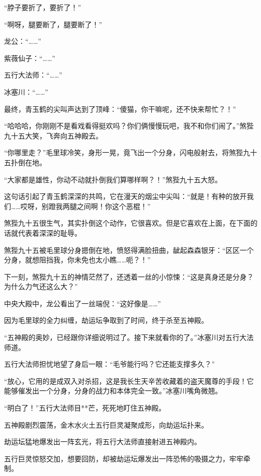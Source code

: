 \begin{this_body}
“脖子要折了，要折了！”

“啊呀，腿要断了，腿要断了！”

龙公：“……”

紫薇仙子：“……”

五行大法师：“……”

冰塞川：“……”

最终，青玉鹤的尖叫声达到了顶峰：“傻猫，你干嘛呢，还不快来帮忙？！”

“哈哈哈，你刚刚不是看戏看得挺欢吗？你们俩慢慢玩吧，我不和你们闹了。”煞狴九十五大笑，飞奔向五神殿去。

“你哪里走？”毛里球冷笑，身形一晃，竟飞出一个分身，闪电般射去，将煞狴九十五扑倒在地。

“大家都是雄性，你动不动就扑倒我们算哪样啊？！”煞狴九十五大怒。

这句话引起了青玉鹤深深的共鸣，它在漫天的烟尘中尖叫：“就是！有种的放开我们……哎呀，别蹬我两腿之间啊！你这个恶棍！”

煞狴九十五很生气，其实扑倒这个动作，它很喜欢。但是它喜欢在上面，在下面的话就代表着深深的耻辱。

煞狴九十五被毛里球分身摁倒在地，愤怒得满脸扭曲，龇起森森银牙：“区区一个分身，就想阻挡我，你未免也太小瞧……呃？！”

下一刻，煞狴九十五的神情茫然了，还透着一丝的小惊悚：“这是真身还是分身？为什么力气还这么大？”

中央大殿中，龙公看出了一丝端倪：“这好像是……”

因为毛里球的全力纠缠，劫运坛争取到了时间，终于杀至五神殿。

“五神殿的奥妙，已经跟你详细说明过了。接下来就看你的了。”冰塞川对五行大法师道。

五行大法师担忧地望了身后一眼：“毛爷能行吗？它还能支撑多久？”

“放心，它用的是成双入对杀招，这是我长生天辛苦收藏着的盗天魔尊的手段！它能够催发出一个分身，分身的战力和本体完全一致。”冰塞川嘴角微翘。

“明白了！”五行大法师目**芒，死死地盯住五神殿。

五神殿剧烈震荡，金木水火土五行巨灵凝聚成形，向劫运坛扑来。

劫运坛猛地爆发出一阵玄光，将五行大法师直接射进五神殿内。

五行巨灵惊怒交加，想要回防，却被劫运坛爆发出一阵恐怖的吸摄之力，牢牢牵制。

\end{this_body}

